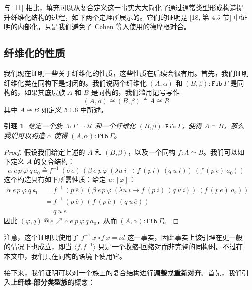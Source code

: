 \documentclass{ctexrep}
\theoremstyle{plain}
\newtheorem{lemma}[theorem]{引理}
\theoremstyle{definition}
\theoremstyle{remark}
\begin{document}
与 [11] 相比，填充可以从复合定义这一事实大大简化了通过通常类型形成构造提升纤维化结构的过程，如下两个定理所展示的。它们的证明是 [18, 第 4.5 节] 中证明的内部化，只是我们避免了 Cohen 等人使用的德摩根对合。


\subsection{纤维化的性质}

我们现在证明一些关于纤维化的性质，这些性质在后续会很有用。首先，我们证明纤维化类在同构下是封闭的。我们说两个纤维化 $(A, \alpha)$ 和 $(B, \beta) : \mathtt{Fib}\ \Gamma$ 是同构的，如果其底层族 $A$ 和 $B$ 是同构的，我们滥用记号写作
\[
(A, \alpha) \cong (B, \beta) \triangleq A \cong B
\]
其中 $A \cong B$ 如定义 5.1.6 中所述。

\begin{lemma}
给定一个族 $A : \Gamma \to \mathcal{U}$ 和一个纤维化 $(B, \beta) : \mathtt{Fib}\ \Gamma$，使得 $A \cong B$，那么我们可以构造 $\alpha$ 使得 $(A, \alpha) : \mathtt{Fib}\ \Gamma$。
\end{lemma}

\begin{proof}
假设我们给定上述的 $A$ 和 $(B, \beta)$，以及一个同构 $f : A \simeq B$。我们可以如下定义 $A$ 的复合结构：
\[
\alpha\ e\ p\ \varphi\ q\ a_0 \triangleq f^{-1}\ (p\ \overline{e})\ (\beta\ e\ p\ \varphi\ (\lambda u\ i \to f\ (p\ i)\ (q\ u\ i))\ (f\ (p\ e)\ a_0))
\]
这个构造具有如下所需性质：给定 $u : [\varphi]$：
\begin{align*}
\alpha\ e\ p\ \varphi\ q\ a_0 &= f^{-1}\ (p\ \overline{e})\ (\beta\ e\ p\ \varphi\ (\lambda u\ i \to f\ (p\ i)\ (q\ u\ i))\ (f\ (p\ e)\ a_0)) \\
&= f^{-1}\ (p\ \overline{e})\ (f\ (p\ \overline{e})\ (q\ u\ \overline{e})) \\
&= q\ u\ \overline{e}
\end{align*}
因此 $(\varphi, q)\ @\ \overline{e} \nearrow \alpha\ e\ p\ \varphi\ q\ a_0$，从而 $(A, \alpha) : \mathtt{Fib}\ \Gamma$。
\end{proof}

注意，这个证明只使用了 $f^{-1}\ x \circ f\ x = id$ 这一事实，因此事实上该引理在更一般的情况下也成立，即当 $\langle f, f^{-1}\rangle$ 只是一个收缩-回缩对而非完整的同构时。不过在本文中，我们只在同构的语境下使用它。

接下来，我们证明可以对一个族上的复合结构进行\textbf{调整}或\textbf{重新对齐}。首先，我们引入\textbf{上纤维-部分类型族}的概念：
\end{document}
